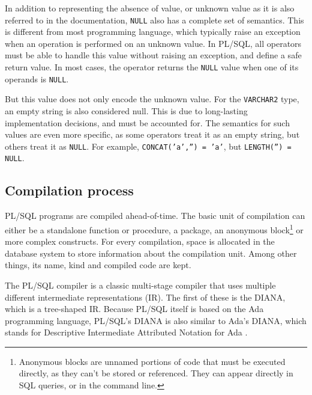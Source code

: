 \documentclass[twoside,11pt,a4paper]{article}
\newcommand{\maybe}[1]{\textit{(maybe ? #1)}}
\newcommand{\pls}[1]{\small\texttt{#1}\normalsize}
\newcommand{\plstype}[1]{\pls{#1}}
\newcommand{\varchar}{\plstype{VARCHAR2}}
\newcommand{\plsnull}{\pls{NULL}}
\begin{document}

In addition to representing the absence of value, or unknown value as it is also referred to in the documentation, \plsnull{} also has a complete set of semantics. This is different from most programming language, which typically raise an exception when an operation is performed on an unknown value. In PL/SQL, all operators must be able to handle this value without raising an exception, and define a safe return value. In most cases, the operator returns the \plsnull{} value when one of its operands is \plsnull{}.

But this value does not only encode the unknown value. For the \varchar{} type, an empty string is also considered null. This is due to long-lasting implementation decisions, and must be accounted for. The semantics for such values are even more specific, as some operators treat it as an empty string, but others treat it as \plsnull{}. For example, \pls{CONCAT('a','') = 'a'}, but \pls{LENGTH('') = NULL}.

\subsection{Compilation process}
\label{sec:plscompilation}


PL/SQL programs are compiled ahead-of-time. The basic unit of compilation can either be a standalone function or procedure, a package, an anonymous block\footnote{Anonymous blocks are unnamed portions of code that must be executed directly, as they can't be stored or referenced. They can appear directly in SQL queries, or in the command line.} or more complex constructs. For every compilation, space is allocated in the database system to store information about the compilation unit. Among other things, its name, kind and compiled code are kept.

The PL/SQL compiler is a classic multi-stage compiler that uses multiple different intermediate representations (IR). The first of these is the DIANA, which is a tree-shaped IR. Because PL/SQL itself is based on the Ada programming language, PL/SQL's DIANA is also similar to Ada's DIANA, which stands for Descriptive Intermediate Attributed Notation for Ada \cite{dianabook}.
\end{document}
